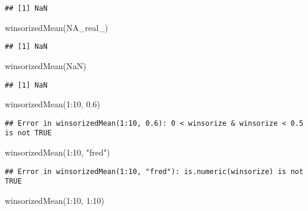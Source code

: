 \documentclass[
]{article}
\newenvironment{Shaded}{\begin{snugshade}}{\end{snugshade}}
\newcommand{\ConstantTok}[1]{\textcolor[rgb]{0.00,0.00,0.00}{#1}}
\newcommand{\DecValTok}[1]{\textcolor[rgb]{0.00,0.00,0.81}{#1}}
\newcommand{\FloatTok}[1]{\textcolor[rgb]{0.00,0.00,0.81}{#1}}
\newcommand{\FunctionTok}[1]{\textcolor[rgb]{0.00,0.00,0.00}{#1}}
\newcommand{\NormalTok}[1]{#1}
\newcommand{\SpecialCharTok}[1]{\textcolor[rgb]{0.00,0.00,0.00}{#1}}
\newcommand{\StringTok}[1]{\textcolor[rgb]{0.31,0.60,0.02}{#1}}
\begin{document}
\begin{verbatim}
## [1] NaN
\end{verbatim}

\begin{Shaded}
\begin{Highlighting}[]
\FunctionTok{winsorizedMean}\NormalTok{(}\ConstantTok{NA\_real\_}\NormalTok{)}
\end{Highlighting}
\end{Shaded}

\begin{verbatim}
## [1] NaN
\end{verbatim}

\begin{Shaded}
\begin{Highlighting}[]
\FunctionTok{winsorizedMean}\NormalTok{(}\ConstantTok{NaN}\NormalTok{)}
\end{Highlighting}
\end{Shaded}

\begin{verbatim}
## [1] NaN
\end{verbatim}

\begin{Shaded}
\begin{Highlighting}[]
\FunctionTok{winsorizedMean}\NormalTok{(}\DecValTok{1}\SpecialCharTok{:}\DecValTok{10}\NormalTok{, }\FloatTok{0.6}\NormalTok{)}
\end{Highlighting}
\end{Shaded}

\begin{verbatim}
## Error in winsorizedMean(1:10, 0.6): 0 < winsorize & winsorize < 0.5 is not TRUE
\end{verbatim}

\begin{Shaded}
\begin{Highlighting}[]
\FunctionTok{winsorizedMean}\NormalTok{(}\DecValTok{1}\SpecialCharTok{:}\DecValTok{10}\NormalTok{, }\StringTok{"fred"}\NormalTok{)}
\end{Highlighting}
\end{Shaded}

\begin{verbatim}
## Error in winsorizedMean(1:10, "fred"): is.numeric(winsorize) is not TRUE
\end{verbatim}

\begin{Shaded}
\begin{Highlighting}[]
\FunctionTok{winsorizedMean}\NormalTok{(}\DecValTok{1}\SpecialCharTok{:}\DecValTok{10}\NormalTok{, }\DecValTok{1}\SpecialCharTok{:}\DecValTok{10}\NormalTok{)}
\end{Highlighting}
\end{Shaded}
\end{document}
